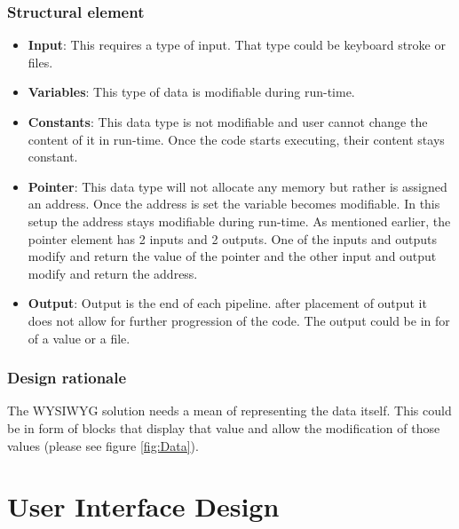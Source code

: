 \documentclass[journal,10pt,onecolumn,compsoc]{IEEEtran} \usepackage[margin=1.0in]{geometry} \usepackage{pdfpages}
\begin{document}
\subsubsection{Structural element}
\begin{itemize}
	\item \textbf{Input}: This requires a type of input. That type could be keyboard stroke or files.
	\item \textbf{Variables}: This type  of data is modifiable during run-time.
    \item \textbf{Constants}: This data type is not modifiable and user cannot change the content of it in run-time. Once the code starts executing, their content stays constant.
    \item \textbf{Pointer}: This data type will not allocate any memory but rather is assigned an address. 
    Once the address is set the variable becomes modifiable.
    In this setup the address stays modifiable during run-time. As mentioned earlier, the pointer element has 2 inputs and 2 outputs. One of the inputs and outputs modify and return the value of the pointer and the other input and output modify and return the address.
    \item \textbf{Output}: Output is the end of each pipeline.
    after placement of output it does not allow for further progression of the code. The output could be in for of a value or a file.
\end{itemize}
\subsubsection{Design rationale}
\noindent The WYSIWYG solution needs a mean of representing the data itself. This could be in form of blocks that display that value and allow the modification of those values (please see figure \ref{fig:Data}). 
\newpage
\section{User Interface Design}
\end{document}
